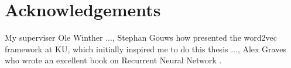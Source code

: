 \chapter{Acknowledgements}

My superviser Ole Winther ..., Stephan Gouws how presented the word2vec framework at KU, which initially inspired me to do this thesis ..., Alex Graves who wrote an excellent book on Recurrent Neural Network \cite{alexgraves}.
